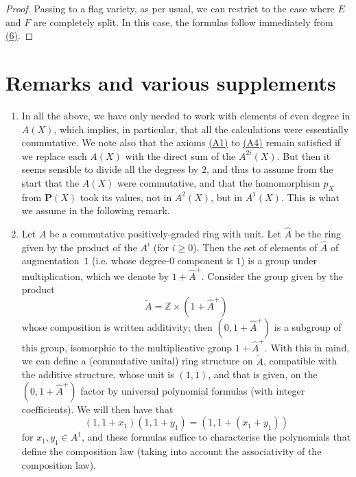\documentclass{article}
\newcommand{\PP}{\mathbf{P}}
\renewcommand{\geq}{\geqslant}
\newcommand{\oldpage}[1]{\marginpar{\footnotesize$\Big\vert$ \textit{p.~#1}}}
\begin{document}
\begin{proof}
  Passing to a flag variety, as per usual, we can restrict to the case where $E$ and $F$ are completely split.
  In this case, the formulas follow immediately from \hyperref[equation6]{(6)}.
\end{proof}


\section{Remarks and various supplements}
\label{section4}

\begin{enumerate}
  \item\label{remark1}
    In all the above, we have only needed to work with elements of even degree in $A(X)$, which implies, in particular, that all the calculations were essentially commutative.
    We note also that the axioms \hyperref[axiomA1]{(A1)} to \hyperref[axiomA4]{(A4)} remain satisfied if we replace each $A(X)$ with the direct sum of the $A^{2i}(X)$.
    But then it seems sensible to divide all the degrees by $2$, and thus to assume from the start that the $A(X)$ were commutative, and that the homomorphism $p_X$ from $\PP(X)$ took its values, not in $A^2(X)$, but in $A^1(X)$.
    This is what we assume in the following remark.
  \item\label{remark2}
    Let $A$ be a commutative positively-graded ring with unit.
    Let $\widehat{A}$ be
\oldpage{148}
    the ring given by the product of the $A^i$ (for $i\geq0$).
    Then the set of elements of $\widehat{A}$ of augmentation~$1$ (i.e. whose degree-$0$ component is $1$) is a group under multiplication, which we denote by $1+\widehat{A}^+$.
    Consider the group given by the product
    \[
      \widetilde{A} = \mathbb{Z}\times(1+\widehat{A}^+)
    \]
    whose composition is written additivity;
    then $(0,1+\widehat{A}^+)$ is a subgroup of this group, isomorphic to the multiplicative group $1+\widehat{A}^+$.
    With this in mind, we can define a (commutative unital) ring structure on $\widetilde{A}$, compatible with the additive structure, whose unit is $(1,1)$, and that is given, on the $(0,1+\widehat{A}^+)$ factor by universal polynomial formulas (with integer coefficients).
    We will then have that
    \[
    \label{equation8}
      (1,1+x_1)(1,1+y_1) = (1,1+(x_1+y_1))
    \tag{8}
    \]
    for $x_1,y_1\in A^1$, and these formulas suffice to characterise the polynomials that define the composition law (taking into account the associativity of the composition law).


\end{enumerate}
\end{document}
